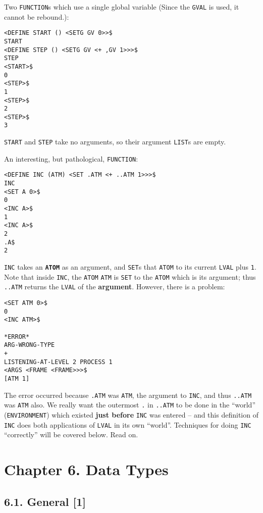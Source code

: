 \documentclass[a4paper,]{article}
\begin{document}
Two \texttt{FUNCTION}s which use a single global variable (Since the \texttt{GVAL} is used, it cannot
be rebound.):

\begin{verbatim}
<DEFINE START () <SETG GV 0>>$
START
<DEFINE STEP () <SETG GV <+ ,GV 1>>>$
STEP
<START>$
0
<STEP>$
1
<STEP>$
2
<STEP>$
3
\end{verbatim}

\texttt{START} and \texttt{STEP} take no arguments, so their argument \texttt{LIST}s are empty.

An interesting, but pathological, \texttt{FUNCTION}:

\begin{verbatim}
<DEFINE INC (ATM) <SET .ATM <+ ..ATM 1>>>$
INC
<SET A 0>$
0
<INC A>$
1
<INC A>$
2
.A$
2
\end{verbatim}

\texttt{INC} takes an \textbf{\texttt{ATOM}} as an argument, and \texttt{SET}s that \texttt{ATOM} to its current
\texttt{LVAL} plus \texttt{1}. Note that inside \texttt{INC}, the \texttt{ATOM} \texttt{ATM} is \texttt{SET} to the
\texttt{ATOM} which is its argument; thus \texttt{..ATM} returns the \texttt{LVAL} of the \textbf{argument}. However, there
is a problem:

\begin{verbatim}
<SET ATM 0>$
0
<INC ATM>$

*ERROR*
ARG-WRONG-TYPE
+
LISTENING-AT-LEVEL 2 PROCESS 1
<ARGS <FRAME <FRAME>>>$
[ATM 1]
\end{verbatim}

The error occurred because \texttt{.ATM} was \texttt{ATM}, the argument to \texttt{INC}, and thus \texttt{..ATM} was
\texttt{ATM} also. We really want the outermost \texttt{.} in \texttt{..ATM} to be done in the ``world''
(\texttt{ENVIRONMENT}) which existed \textbf{just before} \texttt{INC} was entered -- and this definition of \texttt{INC}
does both applications of \texttt{LVAL} in its own ``world''. Techniques for doing \texttt{INC} ``correctly'' will be
covered below. Read on.

\section{Chapter 6. Data Types}\label{chapter-6.-data-types}

\subsection{6.1. General {[}1{]}}\label{general-1-3}
\end{document}
